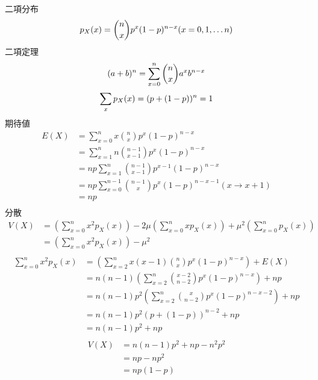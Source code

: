 二項分布
\begin{equation*}
  p_X(x)=\binom{n}{x}p^x(1-p)^{n-x} (x=0,1,\dots n) \\
\end{equation*}
二項定理
\begin{equation*}
  (a+b)^n=\sum_{x=0}^{n}\binom{n}{x}a^xb^{n-x} \\
\end{equation*}
\begin{equation*}
  \sum_{x}p_X(x)=(p+(1-p))^n=1 \\
\end{equation*}
期待値
\begin{align*}
  E(X)&=\sum_{x=0}^{n}x\binom{n}{x}p^x(1-p)^{n-x} \\
  &=\sum_{x=1}^{n}n\binom{n-1}{x-1}p^x(1-p)^{n-x} \\
  &=np\sum_{x=1}^{n}\binom{n-1}{x-1}p^{x-1}(1-p)^{n-x} \\
  &=np\sum_{x=0}^{n-1}\binom{n-1}{x}p^x(1-p)^{n-x-1} (x\rightarrow x+1) \\
  &=np \\
\end{align*}
分散
\begin{align*}
  V(X)&=\left(\sum_{x=0}^{n}x^2p_X(x)\right)-2\mu\left(\sum_{x=0}^{n}xp_X(x)\right)+\mu^2\left(\sum_{x=0}^{n}p_X(x)\right) \\
  &=\left(\sum_{x=0}^{n}x^2p_X(x)\right)-\mu^2 \\
\end{align*}
\begin{align*}
  \sum_{x=0}^{n}x^2p_X(x)&=\left(\sum_{x=2}^{n}x(x-1)\binom{n}{x}p^x(1-p)^{n-x}\right)+E(X) \\
  &=n(n-1)\left(\sum_{x=2}^{n}\binom{x-2}{n-2}p^x(1-p)^{n-x}\right)+np \\
  &=n(n-1)p^2\left(\sum_{x=2}^{n}\binom{x}{n-2}p^x(1-p)^{n-x-2}\right)+np \\
  &=n(n-1)p^2(p+(1-p))^{n-2}+np \\
  &=n(n-1)p^2+np \\
\end{align*}
\begin{align*}
  V(X)&=n(n-1)p^2+np-n^2p^2 \\
  &=np-np^2 \\
  &=np(1-p) \\
\end{align*}